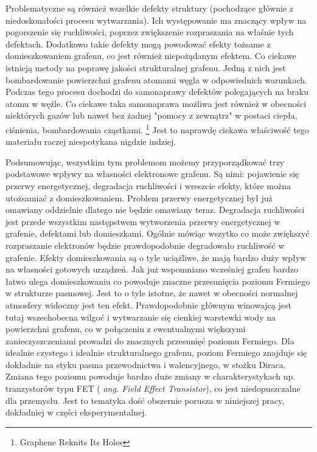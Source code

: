 	Problematyczne są również wszelkie defekty struktury (pochodzące głównie z niedoskonałości procesu wytwarzania). 
	Ich występowanie ma znaczący wpływ na pogorszenie się
	ruchliwości, poprzez zwiększenie rozpraszania na właśnie tych defektach. Dodatkowo takie defekty mogą powodować
	efekty tożsame z domieszkowaniem grafenu, co jest również niepożądanym efektem. 
	Co ciekawe istnieją metody na poprawę
	jakości strukturalnej grafenu. Jedną z nich jest bombardowanie powierzchni grafenu atomami węgla w odpowiednich
	warunkach. Podczas tego procesu dochodzi do samonaprawy defektów polegających na braku atomu w węźle.
	Co ciekawe taka samonaprawa możliwa jest również w obecności niektórych gazów lub nawet bez żadnej "pomocy z zewnątrz" w postaci ciepła, ciśnienia, bombardowania cząstkami. \footnote{Graphene Reknits Its Holes}
	Jest to naprawdę ciekawa właściwość tego materiału raczej niespotykana nigdzie indziej.

	Podsumowując, wszystkim tym problemom możemy przyporządkować trzy podstawowe wpływy na własności elektronowe
	grafenu. Są nimi: pojawienie się przerwy energetycznej, degradacja ruchliwości i wreszcie efekty, które można 
	utożsamiać z domieszkowaniem.
	Problem przerwy energetycznej był już omawiany oddzielnie dlatego nie będzie omawiany teraz.
	Degradacja ruchliwości jest przede wszystkim następstwem wytworzenia przerwy energetycznej w grafenie, 
	defektami lub domieszkami. Ogólnie mówiąc wszytko co może zwiększyć rozpraszanie elektronów będzie 
	prawdopodobnie degradowało ruchliwość w grafenie.
	Efekty domieszkowania są o tyle uciążliwe, że mają bardzo duży wpływ na własności gotowych urządzeń.
	Jak już wspomniano wcześniej grafen bardzo łatwo ulega domieszkowaniu co powoduje znaczne przesunięcia 
	poziomu Fermiego w strukturze pasmowej. Jest to o tyle istotne, że nawet w obecności normalnej 
	atmosfery widoczny jest ten efekt. Prawdopodobnie głównym winowajcą jest tutaj wszechobecna wilgoć
	i wytwarzanie się cienkiej warstewki wody na powierzchni grafenu, co w połączeniu z ewentualnymi 
	większymi zanieczyszczeniami prowadzi do znacznych przesunięć poziomu Fermiego.
	Dla idealnie czystego i idealnie strukturalnego grafenu, poziom
	Fermiego znajduje się dokładnie na styku pasma przewodnictwa i walencyjnego, w stożku Diraca.
	Zmiana tego poziomu powoduje bardzo duże zmiany w charakterystykach np. tranzystorów typu FET (
	\textit{ang. Field Effect Transistor}), co jest niedopuszczalne dla przemysłu.
	Jest to tematyka dość obszernie porusza w niniejszej pracy, dokładniej w części eksperymentalnej.

